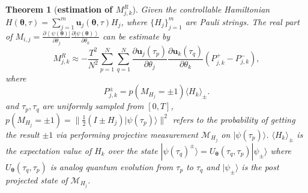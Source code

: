 \documentclass[twocolumn,
pra,aps,superscriptaddress,showpacs,amsmath,amssymb]{revtex4-2}
\newtheorem{theorem}{Theorem}
\begin{document}
\begin{theorem}[{\bf{estimation of $M_{j,k}^R$}}]\label{thm:M_R}
 Given the controllable Hamiltonian $H(\bm{\theta},\tau)=\sum_{j=1}^m\bm{u}_j(\bm{\theta},\tau)H_j$, where $\{H_j\}_{j=1}^m$ are Pauli strings. The real part of $M_{i,j}=\frac{\partial\left<\psi(\bm{\theta})\right|}{\partial\theta_j}\frac{\partial\left|\psi(\bm{\theta})\right>}{\partial\theta_k}$ can be estimate by
\begin{equation}
  M_{j,k}^R  \approx -\frac{T^2}{N^2}\sum_{p=1}^N\sum_{q=1}^N \frac{\partial{\bm{u}_j}(\tau_p)}{\partial{\theta_j}}\frac{\partial{\bm{u}_k}(\tau_q)}{\partial{\theta_k}}\left(P_{j,k}^{+} - P_{j,k}^{-}\right),
\end{equation}
where
 \begin{equation}\label{eq:P}
 P_{j,k}^{\pm} = p(M_{H_j}=\pm1)\langle H_k\rangle_{\pm}.
 \end{equation}
and $\tau_p, \tau_q$ are uniformly sampled from $[0,T]$, $p(M_{H_j}=\pm 1)=\|\frac{1}{2}(I\pm H_j)|\psi(\tau_p)\rangle\|^2$ refers to the probability of getting the result $\pm 1$ via performing projective measurement $\mathcal{M}_{H_j}$ on $|\psi(\tau_p)\rangle$. $\langle H_k\rangle_{\pm}$ is the expectation value of $H_k$ over the state $|\psi(\tau_q)^{\pm}\rangle=U_{\bm{\theta}}(\tau_q,\tau_p)|\psi_{\pm}\rangle$ where $U_{\bm{\theta}}(\tau_q,\tau_p)$ is analog quantum evolution from $\tau_p$ to $\tau_q$ and $|\psi_{\pm}\rangle$ is the post projected state of $\mathcal{M}_{H_j}$. 
\end{theorem}
\end{document}
